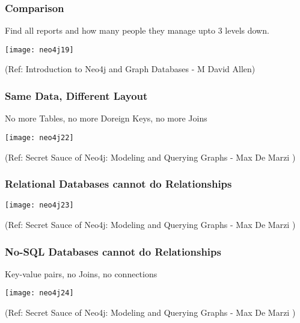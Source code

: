 \begin{frame}[fragile]\frametitle{Comparison}
Find all reports and how many people they manage upto 3 levels down.

\begin{center}
\texttt{[image: neo4j19]}
\end{center}	    

{\tiny (Ref: Introduction to Neo4j and Graph Databases
 - M David Allen)}

\end{frame}

\begin{frame}[fragile]\frametitle{Same Data, Different Layout}
No more Tables, no more Doreign Keys, no more Joins
\begin{center}
\texttt{[image: neo4j22]}
\end{center}	    

{\tiny (Ref: Secret Sauce of Neo4j: Modeling and Querying Graphs
 - Max De Marzi )}

\end{frame}

\begin{frame}[fragile]\frametitle{Relational Databases cannot do Relationships}

\begin{center}
\texttt{[image: neo4j23]}
\end{center}	    

{\tiny (Ref: Secret Sauce of Neo4j: Modeling and Querying Graphs
 - Max De Marzi )}

\end{frame}

\begin{frame}[fragile]\frametitle{No-SQL Databases cannot do Relationships}
Key-value pairs, no Joins, no connections

\begin{center}
\texttt{[image: neo4j24]}
\end{center}	    

{\tiny (Ref: Secret Sauce of Neo4j: Modeling and Querying Graphs
 - Max De Marzi )}

\end{frame}




